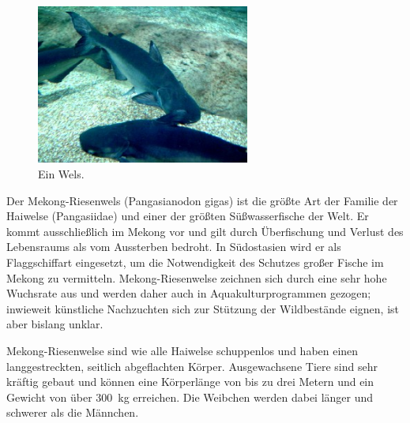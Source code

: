 \documentclass[a4paper, 12pt, pagesize]{scrartcl}
\begin{document}
\begin{figure}
	\includegraphics[width=7cm]{wels.jpg}
	\caption{Ein Wels.}
\end{figure}
\noindent Der Mekong-Riesenwels (Pangasianodon gigas) ist die größte Art der Familie der Haiwelse (Pangasiidae) und einer der größten Süßwasserfische der Welt. Er kommt ausschließlich im Mekong vor und gilt durch Überfischung und Verlust des Lebensraums als vom Aussterben bedroht. In Südostasien wird er als Flaggschiffart eingesetzt, um die Notwendigkeit des Schutzes großer Fische im Mekong zu vermitteln. Mekong-Riesenwelse zeichnen sich durch eine sehr hohe Wuchsrate aus und werden daher auch in Aquakulturprogrammen gezogen; inwieweit künstliche Nachzuchten sich zur Stützung der Wildbestände eignen, ist aber bislang unklar.

Mekong-Riesenwelse sind wie alle Haiwelse schuppenlos und haben einen langgestreckten, seitlich abgeflachten Körper. Ausgewachsene Tiere sind sehr kräftig gebaut und können eine Körperlänge von bis zu drei Metern und ein Gewicht von über \SI{300}{\kg} erreichen. Die Weibchen werden dabei länger und schwerer als die Männchen.
\end{document}
